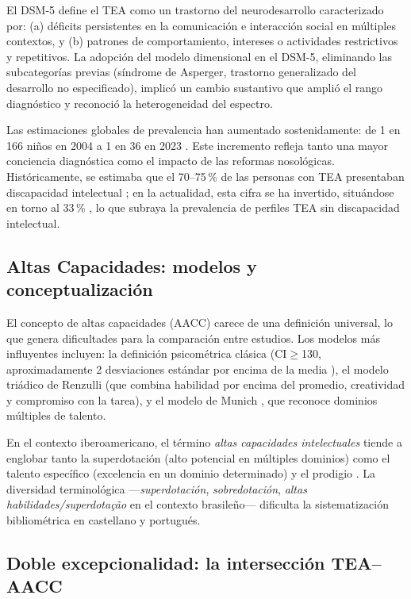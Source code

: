 \documentclass[12pt, a4paper]{article}
\begin{document}
El DSM-5 \parencite{apa2013} define el TEA como un trastorno del neurodesarrollo
caracterizado por: (a) déficits persistentes en la comunicación e interacción social
en múltiples contextos, y (b) patrones de comportamiento, intereses o actividades
restrictivos y repetitivos. La adopción del modelo dimensional en el DSM-5,
eliminando las subcategorías previas (síndrome de Asperger, trastorno generalizado
del desarrollo no especificado), implicó un cambio sustantivo que amplió el rango
diagnóstico y reconoció la heterogeneidad del espectro.

Las estimaciones globales de prevalencia han aumentado sostenidamente: de 1 en 166
niños en 2004 \parencite{cdc2004} a 1 en 36 en 2023 \parencite{maenner2023}. Este
incremento refleja tanto una mayor conciencia diagnóstica como el impacto de las
reformas nosológicas. Históricamente, se estimaba que el 70--75\,\% de las personas
con TEA presentaban discapacidad intelectual \parencite{russell2019}; en la actualidad,
esta cifra se ha invertido, situándose en torno al 33\,\% \parencite{zeidan2022},
lo que subraya la prevalencia de perfiles TEA sin discapacidad intelectual.

\subsection{Altas Capacidades: modelos y conceptualización}

El concepto de altas capacidades (AACC) carece de una definición universal, lo que
genera dificultades para la comparación entre estudios. Los modelos más influyentes
incluyen: la definición psicométrica clásica (CI$\geq$130, aproximadamente 2 desviaciones
estándar por encima de la media \parencite{terman1925}), el modelo triádico de
Renzulli \parencite{renzulli1978} (que combina habilidad por encima del promedio,
creatividad y compromiso con la tarea), y el modelo de Munich \parencite{heller2001},
que reconoce dominios múltiples de talento.

En el contexto iberoamericano, el término \textit{altas capacidades intelectuales}
tiende a englobar tanto la superdotación (alto potencial en múltiples dominios) como
el talento específico (excelencia en un dominio determinado) y el prodigio
\parencite{gagné2004}. La diversidad terminológica —\textit{superdotación},
\textit{sobredotación}, \textit{altas habilidades/superdotação} en el contexto
brasileño— dificulta la sistematización bibliométrica en castellano y portugués.

\subsection{Doble excepcionalidad: la intersección TEA--AACC}
\end{document}
